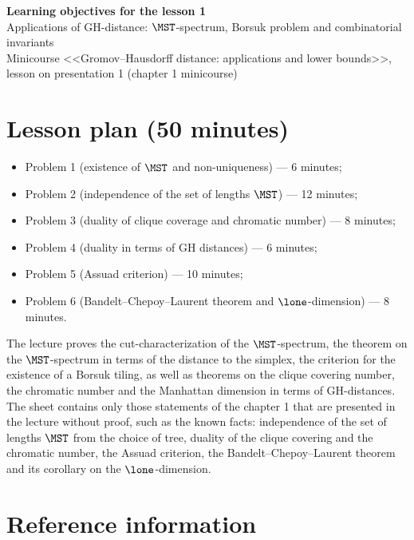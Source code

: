 \documentclass[a4paper,12pt]{report}
\begin{document}
\begin{center}
{\Large\bfseries Learning objectives for the lesson \textup{1}}\\[2mm]
{\large Applications of GH-distance: $\MST$-spectrum, Borsuk problem and combinatorial invariants}\\[2mm]
{\small Minicourse <<Gromov--Hausdorff distance: applications and lower bounds>>, lesson on presentation \textup{1} (chapter \textup{1} minicourse)}
\end{center}

\section*{Lesson plan (\textup{50} minutes)}

\begin{itemize}[leftmargin=*]
\item Problem \textup{1} (existence of $\MST$ and non-uniqueness) --- \textup{6} minutes\textup{;}
\item Problem \textup{2} (independence of the set of lengths $\MST$) --- \textup{12} minutes\textup{;}
\item Problem \textup{3} (duality of clique coverage and chromatic number) --- \textup{8} minutes\textup{;}
\item Problem \textup{4} (duality in terms of GH distances) --- \textup{6} minutes\textup{;}
\item Problem \textup{5} (Assuad criterion) --- \textup{10} minutes\textup{;}
\item Problem \textup{6} (Bandelt--Chepoy--Laurent theorem and $\lone$-dimension) --- \textup{8} minutes.
\end{itemize}

The lecture proves the \textup{cut}-characterization of the $\MST$-spectrum, the theorem on the $\MST$-spectrum in terms of the distance to the simplex, the criterion for the existence of a Borsuk tiling, as well as theorems on the clique covering number, the chromatic number and the Manhattan dimension in terms of GH-distances. The sheet contains only those statements of the chapter \textup{1} that are presented in the lecture without proof, such as the known facts\textup{:} independence of the set of lengths $\MST$ from the choice of tree, duality of the clique covering and the chromatic number, the Assuad criterion, the Bandelt--Chepoy--Laurent theorem and its corollary on the $\lone$-dimension.

\section*{Reference information}
\end{document}
